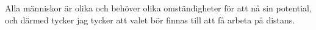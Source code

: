 Alla människor är olika och behöver olika omständigheter för att nå sin potential, och därmed tycker jag tycker att valet bör finnas till att få arbeta på distans.



















































